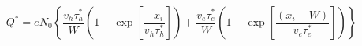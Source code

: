 \documentclass[../main.tex]{subfiles}%
\begin{document}
%
    \Xequation%
    \begin{equation}%
        Q^{*} =%
        eN_{0}%
        \left\{%
            \dfrac{v_{h}\tau_{h}^{*}}{W}%
            \left(%
                1-\exp\left[%
                    \dfrac{-x_{i}}{v_{h}\tau_{h}^{*}}%
                \right]%
            \right)%
            +%
            \dfrac{v_{e}\tau_{e}^{*}}{W}%
            \left(%
                1-\exp\left[%
                    \dfrac{(x_{i}-W)}{v_{e}\tau_{e}^{*}}%
                \right]%
            \right)%
        \right\}%
        \label{eq:charge-induction-value}%
    \end{equation}%
\end{document}
